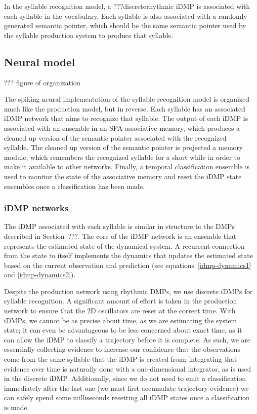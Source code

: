 In the syllable recognition model,
a ???discreterhythmic iDMP is associated
with each syllable in the vocabulary.
Each syllable is also associated
with a randomly generated semantic pointer,
which should be the same semantic pointer
used by the syllable production system
to produce that syllable.

\subsection{Neural model}

??? figure of organization

The spiking neural implementation of
the syllable recognition model
is organized much like the production model,
but in reverse.
Each syllable has an associated
iDMP network that aims to recognize
that syllable.
The output of each iDMP is associated
with an ensemble in
an SPA associative memory,
which produces a cleaned up version
of the semantic pointer
associated with the recognized syllable.
The cleaned up version of the semantic pointer
is projected a memory module,
which remembers the recognized syllable
for a short while in order to
make it available to other networks.
Finally, a temporal classification
ensemble is used to monitor the
state of the associative memory
and reset the iDMP state ensembles
once a classification has been made.

\subsubsection{iDMP networks}

The iDMP associated with each syllable
is similar in structure to the DMPs
described in Section~???.
The core of the iDMP network
is an ensemble that represents
the estimated state of the dynamical system.
A recurrent connection
from the state to itself
implements the dynamics
that updates the estimated state
based on the current observation
and prediction
(see equations~\eqref{idmp-dynamics1}
and \eqref{idmp-dynamics2}).

Despite the production network using rhythmic DMPs,
we use discrete iDMPs for syllable recognition.
A significant amount of effort is taken
in the production network to ensure that
the 2D oscillators are reset at the correct time.
With iDMPs, we cannot be as precise about time,
as we are estimating the system state;
it can even be advantageous
to be less concerned about exact time,
as it can allow the iDMP to classify a trajectory
before it is complete.
As such, we are essentially collecting evidence
to increase our confidence that the
observations come from the same syllable
that the iDMP is created from;
integrating that evidence over time
is naturally done with a one-dimensional integrator,
as is used in the discrete iDMP.
Additionally, since we do not need to emit
a classification immediately after
the last one (we must first accumulate
trajectory evidence)
we can safely spend some milliseconds
resetting all iDMP states
once a classification is made.

